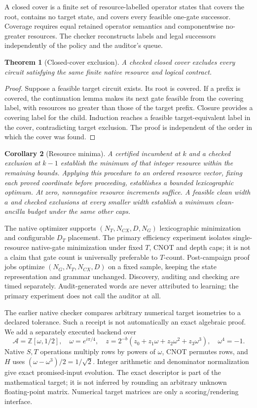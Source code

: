 \documentclass[11pt]{article}
\newtheorem{theorem}{Theorem}
\newtheorem{corollary}[theorem]{Corollary}
\begin{document}
A closed cover is a finite set of resource-labelled operator states that covers the root, contains no target state, and covers every feasible one-gate successor. Coverage requires equal retained operator semantics and componentwise no-greater resources. The checker reconstructs labels and legal successors independently of the policy and the auditor's queue.
\begin{theorem}[Closed-cover exclusion]
A checked closed cover excludes every circuit satisfying the same finite native resource and logical contract.
\end{theorem}
\begin{proof}
Suppose a feasible target circuit exists. Its root is covered. If a prefix is covered, the continuation lemma makes its next gate feasible from the covering label, with resources no greater than those of the target prefix. Closure provides a covering label for the child. Induction reaches a feasible target-equivalent label in the cover, contradicting target exclusion. The proof is independent of the order in which the cover was found.
\end{proof}
\begin{corollary}[Resource minima]
A certified incumbent at $k$ and a checked exclusion at $k-1$ establish the minimum of that integer resource within the remaining bounds. Applying this procedure to an ordered resource vector, fixing each proved coordinate before proceeding, establishes a bounded lexicographic optimum. At zero, nonnegative resource increments suffice. A feasible clean width $a$ and checked exclusions at every smaller width establish a minimum clean-ancilla budget under the same other caps.
\end{corollary}

The native optimizer supports $(N_T,N_{CX},D,N_G)$ lexicographic minimization and configurable $D_T$ placement. The primary efficiency experiment isolates single-resource native-gate minimization under fixed $T$, CNOT and depth caps; it is not a claim that gate count is universally preferable to $T$-count. Post-campaign proof jobs optimize $(N_G,N_T,N_{CX},D)$ on a fixed sample, keeping the state representation and grammar unchanged. Discovery, auditing and checking are timed separately. Audit-generated words are never attributed to learning; the primary experiment does not call the auditor at all.

The earlier native checker compares arbitrary numerical target isometries to a declared tolerance. Such a receipt is not automatically an exact algebraic proof. We add a separately executed backend over
\begin{equation}
 \mathcal A=\mathbb Z[\omega,1/2],\quad \omega=e^{i\pi/4},\quad
 z=2^{-b}(z_0+z_1\omega+z_2\omega^2+z_3\omega^3),\quad \omega^4=-1.
 \label{eq:ring}
\end{equation}
Native $S,T$ operations multiply rows by powers of $\omega$, CNOT permutes rows, and $H$ uses $(\omega-\omega^3)/2=1/\sqrt2$. Integer arithmetic and denominator normalization give exact promised-input evolution. The exact descriptor is part of the mathematical target; it is not inferred by rounding an arbitrary unknown floating-point matrix. Numerical target matrices are only a scoring/rendering interface.
\end{document}
